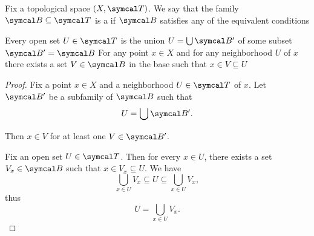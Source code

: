 \begin{definition}\label{def:topological_base}\cite[12]{Engelking1989}
  Fix a topological space \( (X, \Cal{T}) \). We say that the family \( \Cal{B} \subseteq \Cal{T} \) is a  if \( \Cal{B} \) satisfies any of the equivalent conditions
  \begin{defenum}
     Every open set \( U \in \Cal{T} \) is the union \( U = \bigcup \Cal{B}' \) of some subset \( \Cal{B}' = \Cal{B} \)
     For any point \( x \in X \) and for any neighborhood \( U \) of \( x \) there exists a set \( V \in \Cal{B} \) in the base such that \( x \in V \subseteq U \)
  \end{defenum}
\end{definition}
\begin{proof}
   Fix a point \( x \in X \) and a neighborhood \( U \in \Cal{T} \) of \( x \). Let \( \Cal{B}' \) be a subfamily of \( \Cal{B} \) such that
  \begin{equation*}
    U = \bigcup \Cal{B}'.
  \end{equation*}

  Then \( x \in V \) for at least one \( V \in \Cal{B}' \).

   Fix an open set \( U \in \Cal{T} \). Then for every \( x \in U \), there exists a set \( V_x \in \Cal{B} \) such that \( x \in V_x \subseteq U \). We have
  \begin{equation*}
    \bigcup_{x \in U} V_x \subseteq U \subseteq \bigcup_{x \in U} V_x,
  \end{equation*}
  thus
  \begin{equation*}
    U = \bigcup_{x \in U} V_x.
  \end{equation*}
\end{proof}


